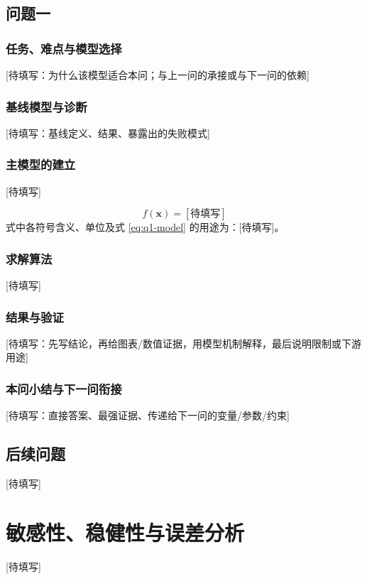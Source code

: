 \documentclass[UTF8,a4paper,12pt]{ctexart}
\begin{document}
\subsection{问题一}
\subsubsection{任务、难点与模型选择}
[待填写：为什么该模型适合本问；与上一问的承接或与下一问的依赖]

\subsubsection{基线模型与诊断}
[待填写：基线定义、结果、暴露出的失败模式]

\subsubsection{主模型的建立}
[待填写]

\begin{equation}
  f(\mathbf{x}) = [待填写]
  \label{eq:q1-model}
\end{equation}
式中各符号含义、单位及式 \eqref{eq:q1-model} 的用途为：[待填写]。

\subsubsection{求解算法}
[待填写]

\subsubsection{结果与验证}
[待填写：先写结论，再给图表/数值证据，用模型机制解释，最后说明限制或下游用途]

\subsubsection{本问小结与下一问衔接}
[待填写：直接答案、最强证据、传递给下一问的变量/参数/约束]

\subsection{后续问题}
[待填写]

\section{敏感性、稳健性与误差分析}
[待填写]
\end{document}
